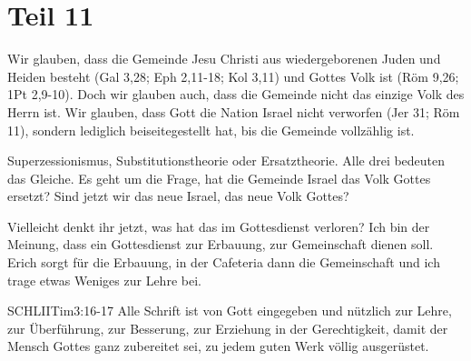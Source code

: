\section{Teil 11}
\begin{otsblock}[Glaubensbekenntnis]
        Wir glauben, dass die Gemeinde Jesu Christi aus wiedergeborenen Juden und Heiden besteht (Gal 3,28; Eph 2,11-18; Kol 3,11) und Gottes Volk ist (Röm 9,26; 1Pt 2,9-10). Doch wir glauben auch, dass die Gemeinde nicht das einzige Volk des Herrn ist. Wir glauben, dass Gott die Nation Israel nicht verworfen (Jer 31; Röm 11), sondern lediglich beiseitegestellt hat, bis die Gemeinde vollzählig ist.
    \end{otsblock}
    \begin{otsblock}[Definition]
        Superzessionismus, Substitutionstheorie oder Ersatztheorie. Alle drei bedeuten das Gleiche. Es geht um die Frage, hat die Gemeinde Israel das Volk Gottes ersetzt? Sind jetzt wir das neue Israel, das neue Volk Gottes?

        Vielleicht denkt ihr jetzt, was hat das im Gottesdienst verloren? Ich bin der Meinung, dass ein Gottesdienst zur Erbauung, zur Gemeinschaft  dienen soll. Erich sorgt für die Erbauung, in der Cafeteria dann die Gemeinschaft und ich trage etwas Weniges zur Lehre bei. 
        \begin{bibelbox}{SCHL}{IITim}{3:16-17}
        Alle Schrift ist von Gott eingegeben und nützlich zur Lehre, zur Überführung, zur Besserung, zur Erziehung in der Gerechtigkeit, damit der Mensch Gottes ganz zubereitet sei, zu jedem guten Werk völlig ausgerüstet.
        \end{bibelbox}
    \end{otsblock}
